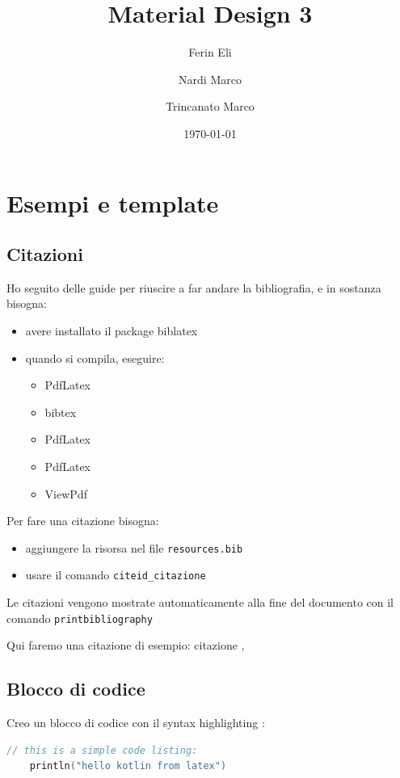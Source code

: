 \documentclass[12pt, a4paper]{report}
\title{Material Design 3}
\author{
	Ferin Eli \and
	Nardi Marco \and
	Trincanato Marco
}
\date{\today}
\begin{document}
\maketitle

\tableofcontents{}



\chapter{Esempi e template}

	\section{Citazioni}
	Ho seguito delle guide per riuscire a far andare la bibliografia, e in sostanza bisogna:
	\begin{itemize}
	\item avere installato il package biblatex
	\item quando si compila, eseguire:
		\begin{itemize}
		\item PdfLatex
		\item bibtex
		\item PdfLatex
		\item PdfLatex
		\item ViewPdf
		\end{itemize}
	\end{itemize}

	Per fare una citazione bisogna:
	\begin{itemize}
	\item aggiungere la risorsa nel file \texttt{resources.bib}
	\item usare il comando \texttt{cite\textbraceleft id\_citazione\textbraceright}
	\end{itemize}

	Le citazioni vengono mostrate automaticamente alla fine del documento con il comando \texttt{printbibliography}

	Qui faremo una citazione di esempio: citazione \cite{example}, \cite{example}

	\section{Blocco di codice}
	Creo un blocco di codice con il syntax highlighting \cite{kotlin_highlight}:
	\begin{lstlisting}[language=Kotlin]
	// this is a simple code listing:
	println("hello kotlin from latex")
	\end{lstlisting}
\end{document}

